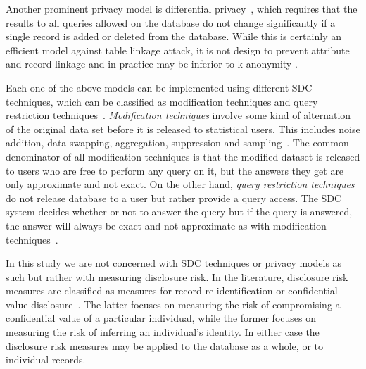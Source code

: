 \documentclass{llncs}
\begin{document}
Another prominent privacy model is differential privacy~\cite{Dwork2006}, which requires that the results to all queries allowed on the database do not change significantly if a single record is added or deleted from the database. While this is certainly an efficient model against table linkage attack, it is not design to
prevent attribute and record linkage \cite{FungWangChenYu2010} and in practice may be inferior to k-anonymity \cite{sra:saf-nai:den:ask}.


Each one of the above models can be implemented using different SDC techniques, which can be classified as modification
techniques and query restriction
techniques~\cite{Brankovic-Zahid:Ch11,Brankovic-Giggins:Ch12,Netherlands-Willenborg:ElementsSDC01,Denning:Cryptography82}.
\emph{Modification techniques} involve some kind of alternation of the
original data set before it is released to statistical users. This
includes noise addition, data swapping, aggregation, suppression
and sampling~\cite{Brankovic-Giggins:Ch12,Brankovic-Zahid:Ch11,isl:bra,bra:lop:mil:seb,isl:bra:05}. The common denominator
of all modification techniques is that the modified dataset is
released to users who are free to perform any query on it, but the
answers they get are only approximate and not exact. On the other hand,
\emph{query restriction techniques} do not release
database to a user but rather provide a query access. The SDC
system decides whether or not to answer the query but if the query
is answered, the answer will always be exact and not approximate
as with modification techniques~\cite{Denning:Cryptography82,Brankovic-Giggins:Ch12}.

In this study we are not concerned with SDC techniques or  privacy models as such but rather with
measuring disclosure risk. In the literature, disclosure risk measures are
classified as
measures for record re-identification or confidential value
disclosure~\cite{Duncan:dissemination86,Lambert:Measures93,Brankovic-Giggins:Ch12}.
The latter focuses on measuring the risk of compromising a
confidential value of a particular individual, while the former
focuses on measuring the risk of inferring an individual's
identity. In either case the disclosure risk measures may
be applied to the database as a whole, or  to
individual records.
\end{document}
